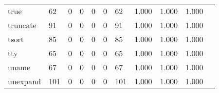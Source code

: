 \begin{longtable}{lp{1.2cm}p{1.2cm}p{1.2cm}p{1.2cm}p{1.2cm}p{1.2cm}p{1.2cm}p{1.2cm}p{1.2cm}p{1.2cm}}
true      &                                    62 &                                                  0 &                                                  0 &                                                  0 &                                                  0 &                                                 62 &                                         1.000 &                                              1.000 &                                              1.000 \\
truncate  &                                    91 &                                                  0 &                                                  0 &                                                  0 &                                                  0 &                                                 91 &                                         1.000 &                                              1.000 &                                              1.000 \\
tsort     &                                    85 &                                                  0 &                                                  0 &                                                  0 &                                                  0 &                                                 85 &                                         1.000 &                                              1.000 &                                              1.000 \\
tty       &                                    65 &                                                  0 &                                                  0 &                                                  0 &                                                  0 &                                                 65 &                                         1.000 &                                              1.000 &                                              1.000 \\
uname     &                                    67 &                                                  0 &                                                  0 &                                                  0 &                                                  0 &                                                 67 &                                         1.000 &                                              1.000 &                                              1.000 \\
unexpand  &                                   101 &                                                  0 &                                                  0 &                                                  0 &                                                  0 &                                                101 &                                         1.000 &                                              1.000 &                                              1.000 \\

\end{longtable}
